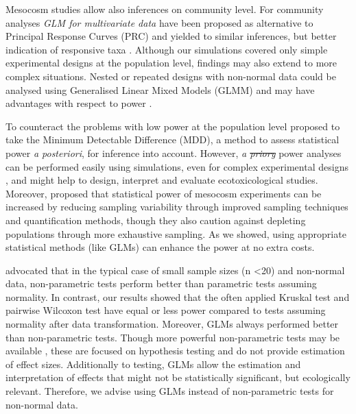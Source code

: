 \documentclass[twocolumn, natbib]{svjour3}
\providecommand{\DIFadd}[1]{{\protect\color{blue}\uwave{#1}}} %
\providecommand{\DIFdel}[1]{{\protect\color{red}\sout{#1}}}                      %
\providecommand{\DIFaddbegin}{} %
\providecommand{\DIFaddend}{} %
\providecommand{\DIFdelbegin}{} %
\providecommand{\DIFdelend}{} %
\begin{document}
Mesocosm studies allow also inferences on community level. 
For community analyses \emph{GLM for multivariate data} \DIFaddbegin \citep{warton_distance-based_2012} \DIFaddend have been proposed as alternative to Principal Response Curves (PRC) and yielded to similar inferences, but better indication of responsive taxa \DIFdelbegin %
\DIFdelend \DIFaddbegin \citep{szocs_analysing_2015}\DIFaddend . 
Although our simulations covered only simple experimental designs at the population level, findings may also extend to more complex situations. 
Nested or repeated designs with non-normal data could be analysed using Generalised Linear Mixed Models (GLMM) and may have advantages with respect to power \citep{stroup_rethinking_2014}.

To counteract the problems with low power at the population level \citet{brock_minimum_2015} proposed to take the Minimum Detectable Difference (MDD), a method to assess statistical power \emph{a posteriori}, for inference into account.
However, \emph{a \DIFdelbegin \DIFdel{priory}\DIFdelend \DIFaddbegin \DIFadd{priori}\DIFaddend } power analyses can be performed easily using simulations, even for complex experimental designs \citep{johnson_power_2014}, and might help to design, interpret and evaluate ecotoxicological studies.
Moreover, \citet{brock_minimum_2015} proposed that statistical power of mesocosm experiments can be increased by reducing sampling variability through improved sampling techniques and quantification methods, though they also caution against depleting populations through more exhaustive sampling.
As we showed, using appropriate statistical methods (like GLMs) can enhance the power at no extra costs.

\citet{wang_making_2011} advocated that in the typical case of small sample sizes (n \textless 20) and non-normal data, non-parametric tests perform better than parametric tests assuming normality.
In contrast, our results showed that the often applied Kruskal test and pairwise Wilcoxon test have equal or less power compared to tests assuming normality after data transformation.
Moreover, GLMs always performed better than non-parametric tests. 
Though more powerful non-parametric tests may be available \citep{konietschke_rank-based_2012}, these are focused on hypothesis testing and do not provide estimation of effect sizes.
Additionally to testing, GLMs allow the estimation and interpretation of effects that might not be statistically significant, but ecologically relevant.
Therefore, we advise using GLMs instead of non-parametric tests for non-normal data.
\end{document}
